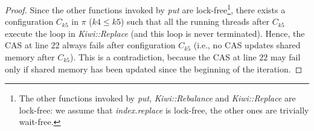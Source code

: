 \begin{proof}
{Since the other functions invoked by \emph{put} are lock-free\footnote{
The other functions invoked by \emph{put}, \emph{Kiwi::Rebalance} and \emph{Kiwi::Replace} are lock-free:
we assume that \emph{index.replace} is lock-free, the other ones are trivially wait-free.},
there exists a configuration $C_{k5}$ in $\pi$ ($k4 \leq k5$) such that all the running threads
after $C_{k5}$ execute the loop in \emph{Kiwi::Replace} (and this loop is never terminated).
%
Hence, the CAS at line $22$ always fails after configuration $C_{k5}$ (i.e., no CAS updates shared memory after $C_{k5}$).
This is a contradiction, because the  CAS at line $22$ may fail only if shared memory has been updated since the beginning of the iteration.



%
%
%
}
\end{proof}
